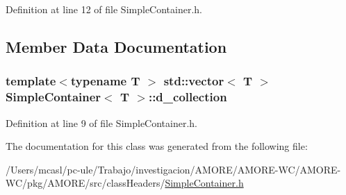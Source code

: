 Definition at line 12 of file SimpleContainer.h.



\subsection{Member Data Documentation}
\hypertarget{class_simple_container_a0be5592282fc09b51a344d4083a7daf9}{
\subsubsection[{d\_\-collection}]{\setlength{\rightskip}{0pt plus 5cm}template$<$typename T $>$ std::vector$<$ T $>$ {\bf SimpleContainer}$<$ T $>$::{\bf d\_\-collection}}}
\label{class_simple_container_a0be5592282fc09b51a344d4083a7daf9}


Definition at line 9 of file SimpleContainer.h.



The documentation for this class was generated from the following file:\begin{DoxyCompactItemize}
\item 
/Users/mcasl/pc-\/ule/Trabajo/investigacion/AMORE/AMORE-\/WC/AMORE-\/WC/pkg/AMORE/src/classHeaders/\hyperlink{_simple_container_8h}{SimpleContainer.h}\end{DoxyCompactItemize}
